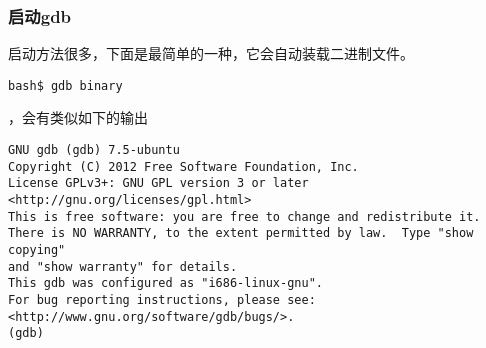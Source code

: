 \documentclass{article}
\begin{document}
\subsubsection{启动gdb}
启动方法很多，下面是最简单的一种，它会自动装载二进制文件。


\begin{verbatim}
bash$ gdb binary
\end{verbatim}


，会有类似如下的输出


\begin{verbatim}
GNU gdb (gdb) 7.5-ubuntu
Copyright (C) 2012 Free Software Foundation, Inc.
License GPLv3+: GNU GPL version 3 or later <http://gnu.org/licenses/gpl.html>
This is free software: you are free to change and redistribute it.
There is NO WARRANTY, to the extent permitted by law.  Type "show copying"
and "show warranty" for details.
This gdb was configured as "i686-linux-gnu".
For bug reporting instructions, please see:
<http://www.gnu.org/software/gdb/bugs/>.
(gdb) 

\end{verbatim}
\end{document}
